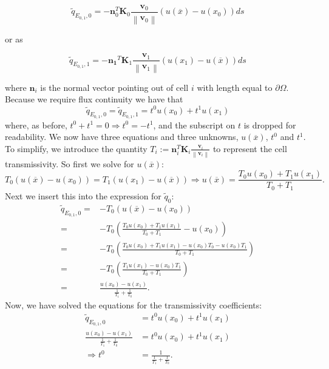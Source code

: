 \documentclass[../Main/main.tex]{subfiles}
\begin{document}
	\begin{equation}\label{eq:f_0}
		\tilde{q}_{E_{0,1},0}=-\bm{n}_0^T \bm{K}_0  \frac{\bm{v}_0}{\left \| \bm{v}_0 \right \|} (u(\overline{x})-u(x_0))ds
	\end{equation}
	
	or as
	
	\begin{equation}\label{eq:f_1}
		\tilde{q}_{E_{0,1},1} = -\bm{n_1}^T \bm{K}_1  \frac{\bm{v}_1}{\left \| \bm{v}_1 \right \|} (u(x_1)-u(\overline{x}))ds
	\end{equation}	
	
	where $\bm{n}_i$ is the normal vector pointing out of cell $i$ with length equal to $\partial \Omega$.
	Because we require flux continuity we have that 
	\begin{equation}
		\tilde{q}_{E_{0,1},0} = \tilde{q}_{E_{0,1},1} = t^0 u(x_0) + t^1 u(x_1)
	\end{equation}
	where, as before, $t^0 + t^1 = 0 \Rightarrow t^0 = -t^1$, and the subscript on $t$ is dropped for readability. We now have three equations and three unknowns, $u(\overline{x})$, $t^0$ and $t^1$. To simplify, we introduce the quantity $T_i := \bm{n}_i^T \bm{K}_i  \frac{\bm{v}_i}{\left \| \bm{v}_i \right \|} $ to represent the cell transmissivity. So first we solve for $u(\overline{x})$:
	\begin{equation}
		T_0(u(\overline{x})-u(x_0)) = T_1(u(x_1)-u(\overline{x})) \Rightarrow u(\overline{x}) = \frac{T_0 u(x_0) + T_1 u(x_1)}{T_0 + T_1}.
	\end{equation}
	Next we insert this into the expression for $\tilde{q}_0$:
	\begin{equation}
		\begin{aligned}
			\tilde{q}_{E_{0,1},0} =& -T_0(u(\overline{x})-u(x_0)) \\
			=& -T_0\left (\frac{T_0 u(x_0) + T_1 u(x_1)}{T_0 + T_1} - u(x_0)\right )\\
			=& -T_0\left (\frac{T_0 u(x_0) + T_1 u(x_1) - u(x_0)T_0 - u(x_0)T_1}{T_0 + T_1}\right ) \\
			=& -T_0\left (\frac{ T_1 u(x_1)  - u(x_0)T_1}{T_0 + T_1}\right)\\
			=& \frac{u(x_0)-u(x_1)}{\frac{1}{T_1} + \frac{1}{T_0}}.
		\end{aligned}
	\end{equation}
	Now, we have solved the equations for the transmissivity coefficients:
	\begin{equation}\label{eq:harmonic mean}
		\begin{aligned}
			\tilde{q}_{E_{0,1},0} &= t^0 u(x_0) + t^1 u(x_1) \\
			\frac{u(x_0)-u(x_1)}{\frac{1}{T_1} + \frac{1}{T_0}} &= t^0 u(x_0) + t^1 u(x_1) \\
			\Rightarrow t^0 &= \frac{1}{\frac{1}{T_1} + \frac{1}{T_0}}.
		\end{aligned}
	\end{equation} 
\end{document}

